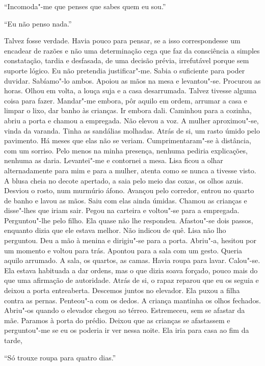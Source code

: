 ``Incomoda"-me que penses que sabes quem eu sou.''

``Eu não penso nada.''

Talvez fosse verdade. Havia pouco para pensar, se a isso correspondesse
um encadear de razões e não uma determinação cega que faz da consciência
a simples constatação, tardia e desfasada, de uma decisão prévia,
irrefutável porque sem suporte lógico. Eu não pretendia justificar"-me.
Sabia o suficiente para poder duvidar. Sabíamo"-lo ambos. Apoiou as mãos
na mesa e levantou"-se. Procurou as horas. Olhou em volta, a louça suja
e a casa desarrumada. Talvez tivesse alguma coisa para fazer. Mandar"-me
embora, pôr aquilo em ordem, arrumar a casa e limpar o lixo, dar banho
às crianças. Ir embora dali. Caminhou para a cozinha, abriu a porta e
chamou a empregada. Não elevou a voz. A mulher aproximou"-se, vinda da
varanda. Tinha as sandálias molhadas. Atrás de si, um rasto úmido pelo
pavimento. Há meses que elas não se veriam. Cumprimentaram"-se à
distância, com um sorriso. Pelo menos na minha presença, nenhuma pediria
explicações, nenhuma as daria. Levantei"-me e contornei a mesa. Lisa
ficou a olhar alternadamente para mim e para a mulher, atenta como se
nunca a tivesse visto. A blusa cheia no decote apertado, a saia pelo
meio das coxas, os olhos azuis. Desviou o rosto, num murmúrio áfono.
Avançou pelo corredor, entrou no quarto de banho e lavou as mãos. Saiu
com elas ainda úmidas. Chamou as crianças e disse"-lhes que iriam sair.
Pegou na carteira e voltou"-se para a empregada. Perguntou"-lhe pelo
filho. Ela quase não lhe respondeu. Afastou"-se dois passos, enquanto
dizia que ele estava melhor. Não indicou de quê. Lisa não lho perguntou.
Deu a mão à menina e dirigiu"-se para a porta. Abriu"-a, hesitou por um
momento e voltou para trás. Apontou para a sala com um gesto. Queria
aquilo arrumado. A sala, os quartos, as camas. Havia roupa para lavar.
Calou"-se. Ela estava habituada a dar ordens, mas o que dizia soava
forçado, pouco mais do que uma afirmação de autoridade. Atrás de si, o
rapaz reparou que eu os seguia e deixou a porta entreaberta. Descemos
juntos no elevador. Ela puxou a filha contra as pernas. Penteou"-a com
os dedos. A criança mantinha os olhos fechados. Abriu"-os quando o
elevador chegou ao térreo. Estremeceu, sem se afastar da mãe.
Paramos à porta do prédio. Deixou que as crianças se afastassem e
perguntou"-me se eu os poderia ir ver nessa noite. Ela iria para casa ao
fim da tarde,

``Só trouxe roupa para quatro dias.''

